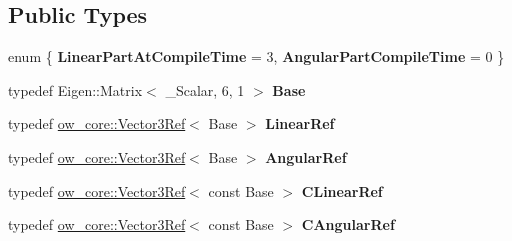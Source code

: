 \subsection*{Public Types}
\begin{DoxyCompactItemize}
\item 
enum \{ {\bfseries Linear\+Part\+At\+Compile\+Time} = 3, 
{\bfseries Angular\+Part\+Compile\+Time} = 0
 \}\hypertarget{structow_1_1traits_3_01ow__core_1_1SpatialVector_3_01__Scalar_01_4_01_4_a5ee6ad9a026569ec39e28432615aebd2}{}\label{structow_1_1traits_3_01ow__core_1_1SpatialVector_3_01__Scalar_01_4_01_4_a5ee6ad9a026569ec39e28432615aebd2}

\item 
typedef Eigen\+::\+Matrix$<$ \+\_\+\+Scalar, 6, 1 $>$ {\bfseries Base}\hypertarget{structow_1_1traits_3_01ow__core_1_1SpatialVector_3_01__Scalar_01_4_01_4_ae1c5cb80aa11e22a936a004168cb9c82}{}\label{structow_1_1traits_3_01ow__core_1_1SpatialVector_3_01__Scalar_01_4_01_4_ae1c5cb80aa11e22a936a004168cb9c82}

\item 
typedef \hyperlink{classow__core_1_1Vector3Ref}{ow\+\_\+core\+::\+Vector3\+Ref}$<$ Base $>$ {\bfseries Linear\+Ref}\hypertarget{structow_1_1traits_3_01ow__core_1_1SpatialVector_3_01__Scalar_01_4_01_4_a52d8207417ed6566a7fff9cec8ede0b5}{}\label{structow_1_1traits_3_01ow__core_1_1SpatialVector_3_01__Scalar_01_4_01_4_a52d8207417ed6566a7fff9cec8ede0b5}

\item 
typedef \hyperlink{classow__core_1_1Vector3Ref}{ow\+\_\+core\+::\+Vector3\+Ref}$<$ Base $>$ {\bfseries Angular\+Ref}\hypertarget{structow_1_1traits_3_01ow__core_1_1SpatialVector_3_01__Scalar_01_4_01_4_a3539bbce610cae0c376e7ab537b270af}{}\label{structow_1_1traits_3_01ow__core_1_1SpatialVector_3_01__Scalar_01_4_01_4_a3539bbce610cae0c376e7ab537b270af}

\item 
typedef \hyperlink{classow__core_1_1Vector3Ref}{ow\+\_\+core\+::\+Vector3\+Ref}$<$ const Base $>$ {\bfseries C\+Linear\+Ref}\hypertarget{structow_1_1traits_3_01ow__core_1_1SpatialVector_3_01__Scalar_01_4_01_4_aab9a528cf84c2a165318d2e12a6f7ef6}{}\label{structow_1_1traits_3_01ow__core_1_1SpatialVector_3_01__Scalar_01_4_01_4_aab9a528cf84c2a165318d2e12a6f7ef6}

\item 
typedef \hyperlink{classow__core_1_1Vector3Ref}{ow\+\_\+core\+::\+Vector3\+Ref}$<$ const Base $>$ {\bfseries C\+Angular\+Ref}\hypertarget{structow_1_1traits_3_01ow__core_1_1SpatialVector_3_01__Scalar_01_4_01_4_a4367dffe2eb8f49990e0c60e8e000bf2}{}\label{structow_1_1traits_3_01ow__core_1_1SpatialVector_3_01__Scalar_01_4_01_4_a4367dffe2eb8f49990e0c60e8e000bf2}

\end{DoxyCompactItemize}


